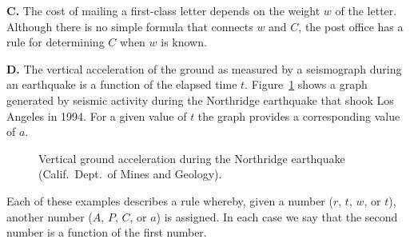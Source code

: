 \documentclass[boxednum]{chapterstart}
\begin{document}
\textbf{C.} The cost of mailing a first-class letter depends on the weight
$w$ of the letter. Although there is no simple formula that connects $w$ and
$C$, the post office has a rule for determining $C$ when $w$ is known.

\textbf{D.} The vertical acceleration of the ground as measured by a
seismograph during an earthquake is a function of the elapsed time $t$.
Figure~\ref{fig:seismo} shows a graph generated by seismic activity during
the Northridge earthquake that shook Los Angeles in 1994. For a given value
of $t$ the graph provides a corresponding value of $a$.

\begin{figure}[htbp]
  \centering
  \caption{Vertical ground acceleration during the Northridge earthquake
    (Calif.\ Dept.\ of Mines and Geology).}
  \label{fig:seismo}
\end{figure}

Each of these examples describes a rule whereby, given a number ($r$, $t$,
$w$, or $t$), another number ($A$, $P$, $C$, or $a$) is assigned. In each
case we say that the second number is a function of the first number.
\end{document}
